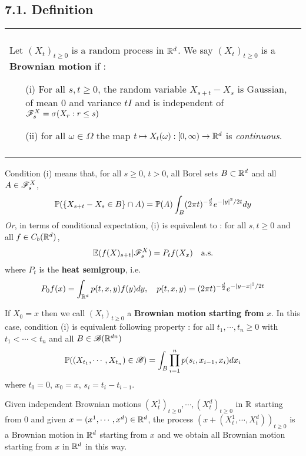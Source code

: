 \documentclass[10pt,a4paper]{report}
\begin{document}
\subsection*{7.1. Definition}

\begin{tabular}{|p{}|}
\hline\\
Let $(X_t)_{t\geq 0}$ is a random process in $\mathbb{R}^d$. We say $(X_t)_{t\geq 0}$ is a \textbf{Brownian motion} if :
\begin{itemize}
\item[(i)] For all $s,t\geq 0$, the random variable $X_{s+t}-X_s$ is Gaussian, of mean 0 and variance $tI$ and is independent of $\mathscr{F}_s^X = \sigma(X_r : r\leq s)$
\item[(ii)] for all $\omega \in \Omega$ the map $t\mapsto X_{t} (\omega) : [0,\infty ) \rightarrow \mathbb{R}^d$ is \emph{continuous}.
\end{itemize}
\\\\\hline
\end{tabular}
\s

Condition (i) means that, for all $s\geq 0$, $t>0$, all Borel sets $B\subset \mathbb{R}^d$ and all $A \in \mathscr{F}_s^X$,
\begin{align*}
\mathbb{P}( \{ X_{s+t} - X_s \in B \} \cap A ) = \mathbb{P}(A) \int_B (2\pi t)^{-\frac{d}{2}} e^{-|y|^2/2t} dy
\end{align*}
\emph{Or}, in terms of conditional expectation, (i) is equivalent to : for all $s,t \geq 0$ and all $f\in C_b (\mathbb{R}^d)$,
\begin{align*}
\mathbb{E} (f(X)_{s+t} | \mathscr{F}^X_s) = P_t f(X_x) \quad \text{a.s.} 
\end{align*}
where $P_t$ is the \textbf{heat semigroup}, i.e. 
\begin{align*}
P_0 f(x) = \int_{\mathbb{R}^d} p(t,x,y)f(y)dy, \quad p(t,x,y) = (2\pi t)^{-\frac{d}{2}}  e^{-|y-x|^2/2t}
\end{align*}
\s

If $X_0 =x$ then we call $(X_t)_{t\geq 0}$ a \textbf{Brownian motion starting from} $x$. In this case, condition (i) is equivalent following property : for all $t_1, \cdots, t_n \geq 0$ with $t_1 < \cdots < t_n$ and all $B \in \mathscr{B}(\mathbb{R}^{dn})$
\begin{align*}
\mathbb{P}( (X_{t_1},\cdots, X_{t_n}) \in \mathscr{B}  ) = \int_B \prod_{i=1}^n p(s_i, x_{i-1},x_i) dx_i
\end{align*}
where $t_0 =0$, $x_0=x$, $s_i = t_i-t_{i-1}$.
\s

Given independent Brownian motions $(X^1_t)_{t\geq 0},\cdots, (X_t^d)_{t\geq 0}$ in $\mathbb{R}$ starting from $0$ and given $x=(x^1, \cdots, x^d) \in \mathbb{R}^d$, the process $(x + (X_t^1, \cdots, X_t^d))_{t\geq 0}$ is a Brownian motion in $\mathbb{R}^d$ starting from $x$ and we obtain all Brownian motion starting from $x$ in $\mathbb{R}^d$ in this way.
\s
\end{document}
